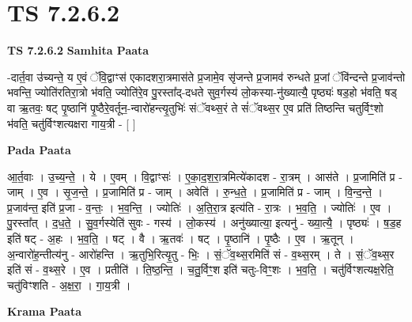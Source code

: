 \documentclass[17pt]{extarticle}
\begin{document}
\section{ TS 7.2.6.2 }

\textbf{TS 7.2.6.2 } \newline
\textbf{Samhita Paata} \newline

-दार्त॒वा उ॑च्यन्ते॒ य ए॒वं ॅवि॒द्वाꣳस॑ एकादशरा॒त्रमास॑ते प्र॒जामे॒व सृ॑जन्ते प्र॒जामव॑ रुन्धते प्र॒जां ॅवि॑न्दन्ते प्र॒जाव॑न्तो भवन्ति॒ ज्योति॑रतिरा॒त्रो भ॑वति॒ ज्योति॑रे॒व पु॒रस्ता᳚द्-दधते सुव॒र्गस्य॑ लो॒कस्या-नु॑ख्यात्यै॒ पृष्ठ्यः॑ षड॒हो भ॑वति॒ षड् वा ऋ॒तवः॒ षट् पृ॒ष्ठानि॑ पृ॒ष्ठैरे॒वर्तून॒-न्वारो॑हन्त्यृ॒तुभिः॑ संॅवथ्स॒रं ते सं॑ॅवथ्स॒र ए॒व प्रति॑ तिष्ठन्ति चतुर्विꣳ॒॒शो भ॑वति॒ चतु॑र्विꣳशत्यक्षरा गाय॒त्री - [  ] \newline

\textbf{Pada Paata} \newline

आ॒र्त॒वाः । उ॒च्य॒न्ते॒ । ये । ए॒वम् । वि॒द्वाꣳसः॑ । ए॒का॒द॒श॒रा॒त्रमित्ये॑कादश - रा॒त्रम् । आस॑ते । प्र॒जामिति॑ प्र - जाम् । ए॒व । सृ॒ज॒न्ते॒ । प्र॒जामिति॑ प्र - जाम् । अवेति॑ । रु॒न्ध॒ते॒ । प्र॒जामिति॑ प्र - जाम् । वि॒न्द॒न्ते॒ । प्र॒जाव॑न्त॒ इति॑ प्र॒जा - व॒न्तः॒ । भ॒व॒न्ति॒ । ज्योतिः॑ । अ॒ति॒रा॒त्र इत्य॑ति - रा॒त्रः । भ॒व॒ति॒ । ज्योतिः॑ । ए॒व । पु॒रस्ता᳚त् । द॒ध॒ते॒ । सु॒व॒र्गस्येति॑ सुवः - गस्य॑ । लो॒कस्य॑ । अनु॑ख्यात्या॒ इत्यनु॑ - ख्या॒त्यै॒ । पृष्ठ्यः॑ । ष॒ड॒ह इति॑ षट् - अ॒हः । भ॒व॒ति॒ । षट् । वै । ऋ॒तवः॑ । षट् । पृ॒ष्ठानि॑ । पृ॒ष्ठैः । ए॒व । ऋ॒तून् । अ॒न्वारो॑ह॒न्तीत्य॑नु - आरो॑हन्ति । ऋ॒तुभि॒रित्यृ॒तु - भिः॒ । सं॒ॅव॒थ्स॒रमिति॑ सं - व॒थ्स॒रम् । ते । सं॒ॅव॒थ्स॒र इति॑ सं - व॒थ्स॒रे । ए॒व । प्रतीति॑ । ति॒ष्ठ॒न्ति॒ । च॒तु॒र्विꣳ॒॒श इति॑ चतुः-विꣳ॒॒शः । भ॒व॒ति॒ । चतु॑र्विꣳशत्यक्ष॒रेति॒ चतु॑विꣳशति - अ॒क्ष॒रा॒ । गा॒य॒त्री ।  \newline


\textbf{Krama Paata} \newline
\end{document}
